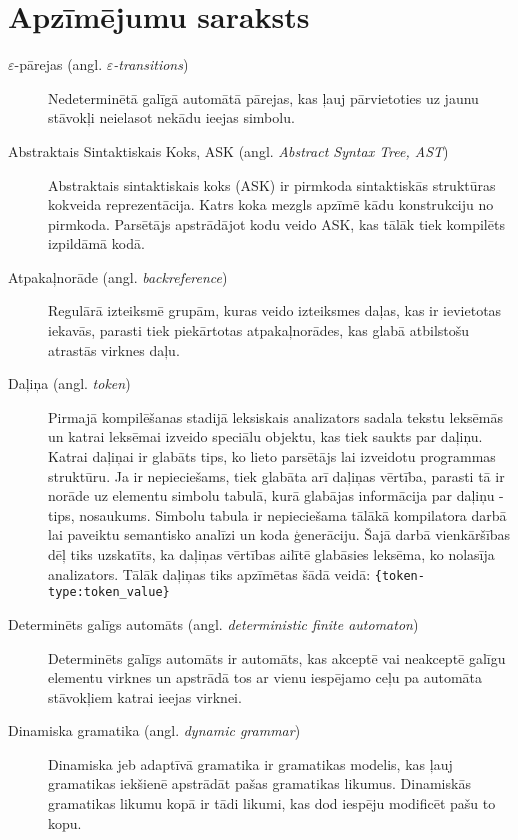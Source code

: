 \section*{Apzīmējumu saraksts}

\begin{description}
\item[$\varepsilon$-pārejas (angl. \emph{$\varepsilon$-transitions})]
Nedeterminētā galīgā automātā pārejas, kas ļauj pārvietoties uz jaunu stāvokļi neielasot nekādu ieejas simbolu.

\item[Abstraktais Sintaktiskais Koks, ASK (angl. \emph{Abstract Syntax Tree, AST})]
Abstraktais sintaktiskais koks (ASK) ir pirmkoda sintaktiskās struktūras kokveida reprezentācija. Katrs koka mezgls apzīmē kādu konstrukciju no pirmkoda. Parsētājs apstrādājot kodu veido ASK, kas tālāk tiek kompilēts izpildāmā kodā.

\item[Atpakaļnorāde (angl. \emph{backreference})]
Regulārā izteiksmē grupām, kuras veido izteiksmes daļas, kas ir ievietotas iekavās, parasti tiek piekārtotas atpakaļnorādes, kas glabā atbilstošu atrastās virknes daļu.

\item[Daļiņa (angl. \emph{token})]
Pirmajā kompilēšanas stadijā leksiskais analizators sadala tekstu leksēmās un katrai leksēmai izveido speciālu objektu, kas tiek saukts par daļiņu. Katrai daļiņai ir glabāts tips, ko lieto parsētājs lai izveidotu programmas struktūru. Ja ir nepieciešams, tiek glabāta arī daļiņas vērtība, parasti tā ir norāde uz elementu simbolu tabulā, kurā glabājas informācija par daļiņu - tips, nosaukums. Simbolu tabula ir nepieciešama tālākā kompilatora darbā lai paveiktu semantisko analīzi un koda ģenerāciju. Šajā darbā vienkāršības dēļ tiks uzskatīts, ka daļiņas vērtības ailītē glabāsies leksēma, ko nolasīja analizators. Tālāk daļiņas tiks apzīmētas šādā veidā: \texttt{\{token-type:token\_value\}}

\item[Determinēts galīgs automāts (angl. \emph{deterministic finite automaton})]
Determinēts galīgs automāts ir automāts, kas akceptē vai neakceptē galīgu elementu virknes un apstrādā tos ar vienu iespējamo ceļu pa automāta stāvokļiem katrai ieejas virknei.~\cite{Hopcroft:IntroAutomataTheory}

\item[Dinamiska gramatika (angl. \emph{dynamic grammar})]
Dinamiska jeb adaptīvā gramatika ir gramatikas modelis, kas ļauj gramatikas iekšienē apstrādāt pašas gramatikas likumus. Dinamiskās gramatikas likumu kopā ir tādi likumi, kas dod iespēju modificēt pašu to kopu.


\end{description}
